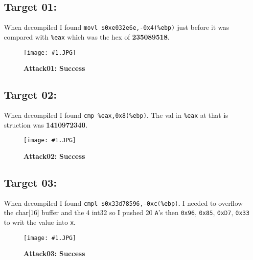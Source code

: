 \documentclass[11pt]{book}
\newcommand*{\img}[2]{
  \begin{figure}[!ht]
    \flushleft
    \texttt{[image: \#1.JPG]}
    \caption{\bf #2}
    \label{fig:#1}
\end{figure}}
\begin{document}
\newpage


\subsection*{Target 01:}
\indent When decompiled I found {\tt movl   \$0xe032e6e,-0x4(\%ebp)} just before it was compared with {\tt \%eax} which was the hex of {\bf 235089518}.

\img{Attack01}{Attack01: Success}


\subsection*{Target 02:}
\indent When decompiled I found {\tt cmp    \%eax,0x8(\%ebp)}. The val in {\tt \%eax} at that is struction was {\bf 1410972340}.

\img{Attack02}{Attack02: Success}


\subsection*{Target 03:}
\indent When decompiled I found {\tt cmpl   \$0x33d78596,-0xc(\%ebp)}. I needed to overflow the char[16] buffer and the 4 int32 so I pushed 20 {\tt A}'s then {\tt 0x96}, {\tt 0x85}, {\tt 0xD7}, {\tt 0x33} to writ the value into {\tt x}.

\img{Attack03}{Attack03: Success}
\end{document}
